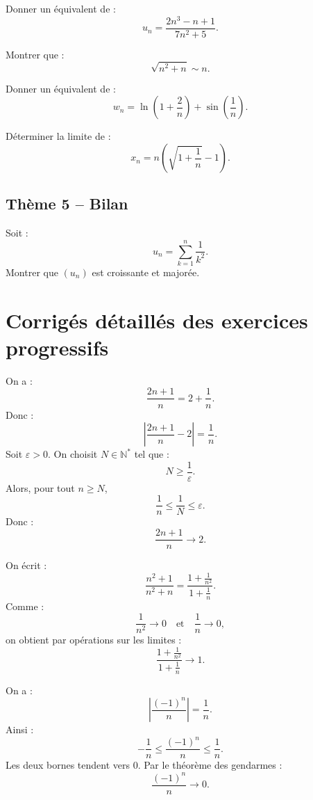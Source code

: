 \documentclass[11pt,a4paper]{article}
\newcommand{\N}{\mathbb N}
\begin{document}
\begin{exercicebox}[8]
Donner un équivalent de :
\[
u_n=\frac{2n^3-n+1}{7n^2+5}.
\]
\end{exercicebox}

\begin{exercicebox}[9]
Montrer que :
\[
\sqrt{n^2+n}\sim n.
\]
\end{exercicebox}

\begin{exercicebox}[10]
Donner un équivalent de :
\[
w_n=\ln\left(1+\frac2n\right)+\sin\left(\frac1n\right).
\]
\end{exercicebox}

\begin{exercicebox}[11]
Déterminer la limite de :
\[
x_n=n\left(\sqrt{1+\frac1n}-1\right).
\]
\end{exercicebox}

\subsection*{Thème 5 -- Bilan}

\begin{exercicebox}[12]
Soit :
\[
u_n=\sum_{k=1}^n\frac1{k^2}.
\]
Montrer que \((u_n)\) est croissante et majorée.
\end{exercicebox}

\newpage
\section{Corrigés détaillés des exercices progressifs}

\begin{correctionbox}[1]
On a :
\[
\frac{2n+1}{n}=2+\frac1n.
\]
Donc :
\[
\left|\frac{2n+1}{n}-2\right|=\frac1n.
\]
Soit \(\varepsilon>0\). On choisit \(N\in\N^*\) tel que :
\[
N\geq\frac1\varepsilon.
\]
Alors, pour tout \(n\geq N\),
\[
\frac1n\leq\frac1N\leq\varepsilon.
\]
Donc :
\[
\frac{2n+1}{n}\to2.
\]
\end{correctionbox}

\begin{correctionbox}[2]
On écrit :
\[
\frac{n^2+1}{n^2+n}
=
\frac{1+\frac1{n^2}}{1+\frac1n}.
\]
Comme :
\[
\frac1{n^2}\to0
\quad\text{et}\quad
\frac1n\to0,
\]
on obtient par opérations sur les limites :
\[
\frac{1+\frac1{n^2}}{1+\frac1n}\to1.
\]
\end{correctionbox}

\begin{correctionbox}[3]
On a :
\[
\left|\frac{(-1)^n}{n}\right|=\frac1n.
\]
Ainsi :
\[
-\frac1n\leq\frac{(-1)^n}{n}\leq\frac1n.
\]
Les deux bornes tendent vers \(0\). Par le théorème des gendarmes :
\[
\frac{(-1)^n}{n}\to0.
\]
\end{correctionbox}
\end{document}

